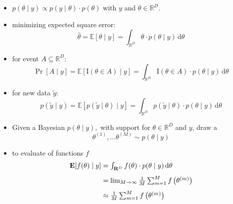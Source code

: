 \documentclass[10pt]{report}
\newcommand{\expect}[1]{\mathbb{E}\!\left[ #1 \right]}
\newcommand{\draw}[2]{#1^{(#2)}}
\begin{document}
\begin{itemize}
\item {} $p(\theta \mid y) \propto p(y \mid \theta) \cdot
  p(\theta)$ with  $y$ and  $\theta \in \mathbb{R}^D$.
\item {} minimizing expected square error:
  $$ \textstyle
  \widehat{\theta}
  = \expect{\theta \mid y}
  = \int_{\mathbb{R}^D}
  \theta \cdot p(\theta \mid y)
  \, \textrm{d}\theta 
  $$
\item {} for event $A \subseteq \mathbb{R}^D$:
  $$ \textstyle
  \Pr[A \mid y]
  = \expect{\textrm{I}(\theta \in A) \mid y}
  = \int_{\mathbb{R}^D}
  \textrm{I}(\theta \in A) \cdot p(\theta \mid y) 
  \, \textrm{d}\theta 
  $$
\item {} for new data $\widetilde{y}$:
  $$ \textstyle
  p(\widetilde{y} \mid y) 
  = \expect{p(\widetilde{y} \mid \theta) \mid y}
  = \int_{\mathbb{R}^D}
  p(\widetilde{y} \mid \theta) \cdot p(\theta \mid y) 
  \, \textrm{d}\theta 
  $$
\end{itemize}


\begin{itemize}
\item Given a Bayesian  $p(\theta \mid y),$
  with support for  $\theta \in \mathbb{R}^D$ and  $y$,
  draw a 
  $$ \textstyle
  \draw{\theta}{1}, \ldots \draw{\theta}{M} \sim p(\theta \mid y)
  $$
\item to evaluate  of functions $f$
  \begin{align}
    \textstyle 
  \expect{f(\theta) \mid y}
  &= \textstyle \int_{\mathbb{R}^D} f(\theta) \cdot p(\theta \mid y) \,
    \textrm{d}\theta
  \\[4pt]
  &= \textstyle \lim_{M \rightarrow \infty} \frac{1}{M} \sum_{m=1}^M 
f\left( \draw{\theta}{m} \right)
  \\[4pt] \textstyle
  &\approx \textstyle \frac{1}{M} \sum_{m=1}^M f\left(\draw{\theta}{m}\right) 
\end{align}
\end{itemize}
\end{document}
